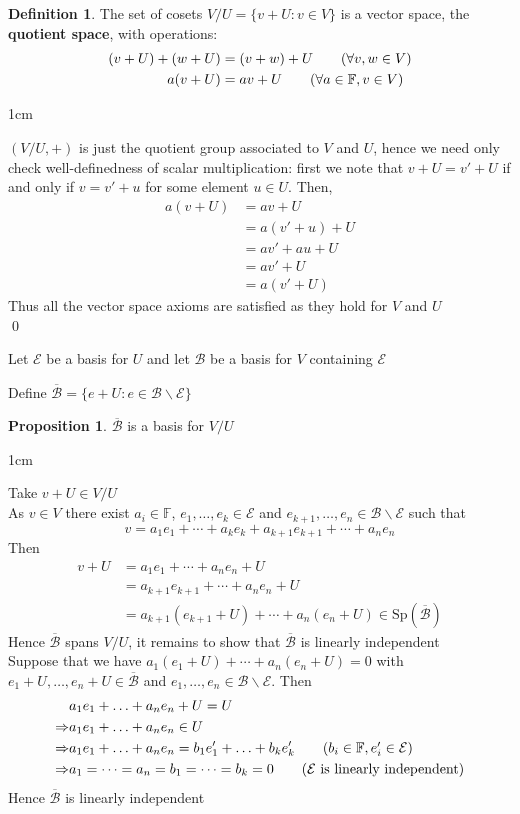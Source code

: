 \documentclass[11pt, a4paper]{report}
\makeatletter
\numberwithin{equation}{section}
\newcommand{\bk}{\backslash}
\newcommand{\F}{\mathbb{F}}
\newcommand{\Sp}{\text{Sp}}
\numberwithin{equation}{subsection}
\theoremstyle{plain}
\theoremstyle{definition}
\newtheorem{defn}{Definition}[chapter]
\newtheorem{prop}[thm]{Proposition}
\theoremstyle{remark}
\newtheorem*{prf}{Proof}
\renewenvironment{prf}[1][\proofname]{\par
  \vspace{-\topsep}%
  \normalfont
  \topsep0pt \partopsep0pt %
  \trivlist
  \item[\hskip\labelsep
        \itshape
    #1\@addpunct{.}]\ignorespaces
}{%
  \popQED\endtrivlist\@endpefalse
  \addvspace{6pt plus 6pt} %
}
\newcommand{\pr}[1]{\begin{adjustwidth}{1cm}{} \begin{prf} #1 \end{prf} \end{adjustwidth}}
\makeatother
\begin{document}
\begin{defn} The set of cosets $V/U = \{ v + U : v \in V \}$ is a vector space, the \textbf{quotient space}, with operations:
\begin{align*}
(v + U) + (w + U) &= (v + w) + U\tag{$\forall v,w \in V$}\\
a ( v + U ) &= av + U \tag{$\forall a \in \F, v \in V$}
\end{align*}\end{defn}
\pr{
$( V/U, +)$ is just the quotient group associated to $V$ and $U$, hence we need only check well-definedness of scalar multiplication: first we note that $v + U = v' + U$ if and only if $v = v' + u$ for some element $u \in U$. Then,
\begin{align*}
a(v+ U) 	&= av + U\\
			&= a(v' + u) + U\\
			&= av' + au + U\\
			&= av' + U \tag{since $U$ is a vector space it is closed under linear multipication}\\
			&= a(v' + U)				 
\end{align*}
Thus all the vector space axioms are satisfied as they hold for $V$ and $U$ \\[-8pt]\qed
}
\newpage 
Let $\mathcal{E}$ be a basis for $U$ and let $\mathcal{B}$ be a basis for $V$ containing $\mathcal{E}$

Define $\overline{\mathcal{B}} = \{ e + U : e \in \mathcal{B} \bk \mathcal{E}\}$

\begin{prop} $\overline{\mathcal{B}}$ is a basis for $V/U$
\pr{
Take $v + U \in V/U$\\
As $v \in V$ there exist $a_i \in \F$, $e_1, \ldots, e_k \in \mathcal{E}$ and $e_{k+1}, \ldots, e_n \in \mathcal{B} \bk \mathcal{E}$ such that $$v = a_1 e_1 + \cdots + a_k e_k + a_{k+1} e_{k+1} + \cdots + a_n e_n$$
Then
\begin{align*}
v+U 	&= a_1 e_1 + \cdots + a_n e_n + U\\
		&= a_{k+1} e_{k+1} + \cdots + a_n e_n + U \tag{$a_1 e_1 + \cdots + a_k e_k \in U$}\\
		&= a_{k+1} (e_{k+1} + U) + \cdots + a_n (e_n + U) \in \Sp \left( \overline{\mathcal{B}} \right)
\end{align*}
Hence $\overline{\mathcal{B}}$ spans $V/U$, it remains to show that $\overline{\mathcal{B}}$ is linearly independent\\
Suppose that we have $a_1(e_1 + U) + \cdots + a_n (e_n + U) = 0$ with $e_1 + U, \ldots, e_n + U \in \overline{\mathcal{B}}$ and $e_1, \ldots, e_n \in \mathcal{B} \bk \mathcal{E}$. Then
\begin{align*}
				&a_1 e_1 + \ldots + a_n e_n + U = U\\
\Rightarrow	 	&a_1 e_1 + \ldots + a_n e_n \in U\\
\Rightarrow		&a_1 e_1 + \ldots + a_n e_n = b_1 e'_1 + \ldots + b_k e'_k \tag{$b_i \in \F, e'_i \in \mathcal{E}$}\\
\Rightarrow 	&a_1 = \cdots = a_n = b_1 = \cdots = b_k = 0 \tag{$\mathcal{E}$ is linearly independent}
\end{align*}
Hence $\overline{\mathcal{B}}$ is linearly independent
}\end{prop}
\end{document}
